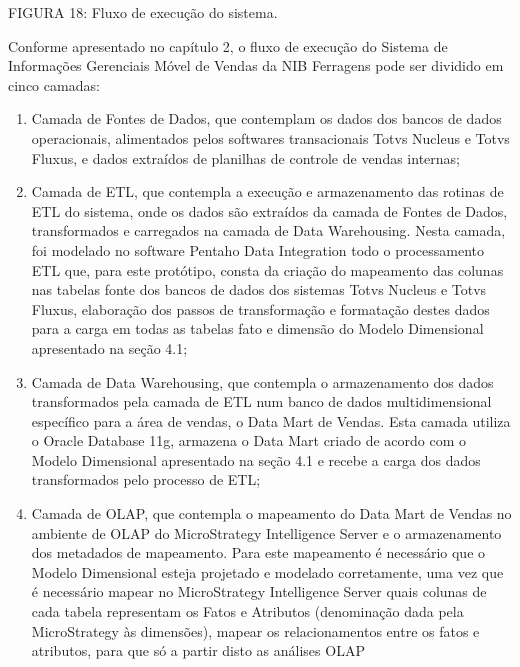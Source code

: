 \documentclass[a4paper]{article}
\newcommand\liststyleWWviiiNumxix{%
\renewcommand\theenumi{\alph{enumi}}
\renewcommand\theenumii{\alph{enumii}}
\renewcommand\theenumiii{\roman{enumiii}}
\renewcommand\theenumiv{\arabic{enumiv}}
\renewcommand\labelenumi{\theenumi)}
\renewcommand\labelenumii{\theenumii.}
\renewcommand\labelenumiii{\theenumiii.}
\renewcommand\labelenumiv{\theenumiv.}
}
\begin{document}
{
\textsf{\MakeUppercase{FIGURA 18}}\textsf{: Fluxo de execu\c{c}\~ao do sistema.\newline
}}

{
\textsf{Conforme apresentado no cap\'itulo 2, o fluxo de execu\c{c}\~ao do Sistema de Informa\c{c}\~oes Gerenciais
M\'ovel de Vendas da NIB Ferragens pode ser dividido em cinco camadas:}}

\liststyleWWviiiNumxix
\begin{enumerate}
\item {
\textsf{Camada de Fontes de Dados, que contemplam os dados dos bancos de dados operacionais, alimentados pelos softwares
transacionais Totvs Nucleus e Totvs Fluxus, e dados extra\'idos de planilhas de controle de vendas internas;}}
\item {
\textsf{Camada de ETL, que contempla a execu\c{c}\~ao e armazenamento das rotinas de ETL do sistema, onde os dados s\~ao
extra\'idos da camada de Fontes de Dados, transformados e carregados na camada de Data Warehousing. Nesta camada, foi
modelado no software Pentaho Data Integration todo o processamento ETL que, para este prot\'otipo, consta da
cria\c{c}\~ao do mapeamento das colunas nas tabelas fonte dos bancos de dados dos sistemas Totvs Nucleus e Totvs
Fluxus, elabora\c{c}\~ao dos passos de transforma\c{c}\~ao e formata\c{c}\~ao destes dados para a carga em todas as
tabelas fato e dimens\~ao do Modelo Dimensional apresentado na se\c{c}\~ao 4.1;}}
\item {
\textsf{Camada de Data Warehousing, que contempla o armazenamento dos dados transformados pela camada de ETL num banco
de dados multidimensional espec\'ifico para a \'area de vendas, o Data Mart de Vendas. Esta camada utiliza o Oracle
Database 11g, armazena o Data Mart criado de acordo com o Modelo Dimensional apresentado na se\c{c}\~ao 4.1 e recebe a
carga dos dados transformados pelo processo de ETL;}}
\item {
\textsf{Camada de OLAP, que contempla o mapeamento do Data Mart de Vendas no ambiente de OLAP do MicroStrategy
Intelligence Server e o armazenamento dos metadados de mapeamento. Para este mapeamento \'e necess\'ario que o Modelo
Dimensional esteja projetado e modelado corretamente, uma vez que \'e necess\'ario mapear no MicroStrategy Intelligence
Server quais colunas de cada tabela representam os Fatos e Atributos (denomina\c{c}\~ao dada pela MicroStrategy \`as
dimens\~oes), mapear os relacionamentos entre os fatos e atributos, para que s\'o a partir disto as an\'alises OLAP
}}
\end{enumerate}
\end{document}
